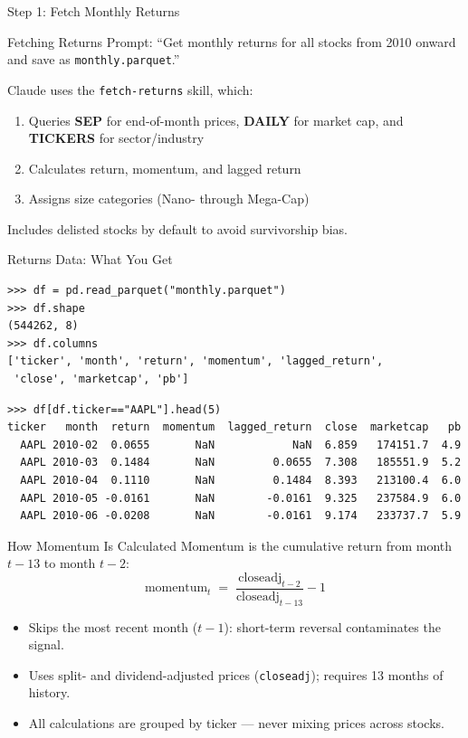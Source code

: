 \documentclass[aspectratio=169,t]{beamer}
\begin{document}

\begin{frame}[c]
\centering
\Huge Step 1: Fetch Monthly Returns
\end{frame}

\begin{frame}{Fetching Returns}
\alert{Prompt:} ``Get monthly returns for all stocks from 2010 onward and save as \texttt{monthly.parquet}.''
\vspace{0.3cm}

Claude uses the \texttt{fetch-returns} skill, which:
\begin{enumerate}
\item Queries \textbf{SEP} for end-of-month prices, \textbf{DAILY} for market cap, and \textbf{TICKERS} for sector/industry
\item Calculates return, momentum, and lagged return
\item Assigns size categories (Nano- through Mega-Cap)
\end{enumerate}

\vspace{0.3cm}
Includes \alert{delisted stocks} by default to avoid survivorship bias.
\end{frame}

\begin{frame}[fragile]{Returns Data: What You Get}
\small
\begin{verbatim}
>>> df = pd.read_parquet("monthly.parquet")
>>> df.shape
(544262, 8)
>>> df.columns
['ticker', 'month', 'return', 'momentum', 'lagged_return',
 'close', 'marketcap', 'pb']
\end{verbatim}
\vspace{0.2cm}
\begin{verbatim}
>>> df[df.ticker=="AAPL"].head(5)
ticker   month  return  momentum  lagged_return  close  marketcap   pb
  AAPL 2010-02  0.0655       NaN            NaN  6.859   174151.7  4.9
  AAPL 2010-03  0.1484       NaN         0.0655  7.308   185551.9  5.2
  AAPL 2010-04  0.1110       NaN         0.1484  8.393   213100.4  6.0
  AAPL 2010-05 -0.0161       NaN        -0.0161  9.325   237584.9  6.0
  AAPL 2010-06 -0.0208       NaN        -0.0161  9.174   233737.7  5.9
\end{verbatim}
\end{frame}

\begin{frame}{How Momentum Is Calculated}
Momentum is the cumulative return from month $t{-}13$ to month $t{-}2$:
\[
\text{momentum}_t \;=\; \frac{\text{closeadj}_{t-2}}{\text{closeadj}_{t-13}} - 1
\]

\begin{itemize}
\item Skips the most recent month ($t{-}1$): short-term reversal contaminates the signal.
\item Uses split- and dividend-adjusted prices (\texttt{closeadj}); requires 13 months of history.
\item All calculations are \alert{grouped by ticker} --- never mixing prices across stocks.
\end{itemize}
\end{frame}
\end{document}
